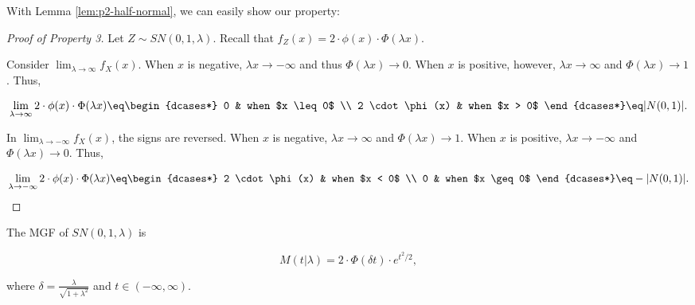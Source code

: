 With Lemma \ref{lem:p2-half-normal}, we can easily show our property:

\begin{proof}[Proof of Property 3]
  Let $Z \sim SN(0,1,\lambda)$. Recall that $f_Z(x) = 2 \cdot \phi(x) \cdot
  \Phi(\lambda x)$.

  Consider $\lim_{\lambda \to \infty} f_X(x)$. When $x$ is negative, $\lambda x
  \to -\infty$ and thus $\Phi(\lambda x) \to 0$. When $x$ is positive, however,
  $\lambda x \to \infty$ and $\Phi(\lambda x) \to 1$. Thus,

  \begin{equation}
    \label{eq:p2-positive-half-normal}
    \lim_{\lambda \to \infty} 2 \cdot \phi(x) \cdot \Phi(\lambda x) \eq
    \begin{dcases*}
      0 & when $x \leq 0$ \\
      2 \cdot \phi(x) & when $x > 0$
    \end{dcases*}
    \eq |N(0,1)|.
  \end{equation}

  In $\lim_{\lambda \to -\infty} f_X(x)$, the signs are reversed. When $x$ is
  negative, $\lambda x \to \infty$ and $\Phi(\lambda x) \to 1$. When $x$ is
  positive, $\lambda x \to -\infty$ and $\Phi(\lambda x) \to 0$. Thus,

  \begin{equation}
    \label{eq:p2-negative-half-normal}
    \lim_{\lambda \to -\infty} 2 \cdot \phi(x) \cdot \Phi(\lambda x) \eq
    \begin{dcases*}
      2 \cdot \phi(x) & when $x < 0$ \\
      0 & when $x \geq 0$
    \end{dcases*}
    \eq -|N(0,1)|.
  \end{equation}
\end{proof}


\begin{property} \label{prop:4}
  The MGF of $SN(0,1,\lambda)$ is

  \begin{equation} \label{eq:p4-sn-mgf}
    M(t|\lambda) = 2 \cdot \Phi (\delta t) \cdot e^{t^2/2},
  \end{equation}
    
  where $\delta = \frac{\lambda}{\sqrt{1 + \lambda^2}}$ and $t \in (-\infty, \infty)$.
\end{property}

